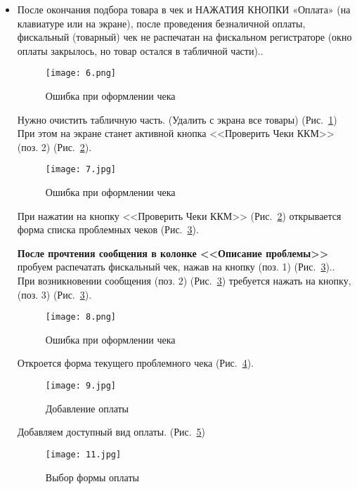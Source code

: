 \begin{itemize}	
	\item После окончания подбора товара в чек и НАЖАТИЯ КНОПКИ «Оплата» (на клавиатуре или на экране), после проведения безналичной оплаты, фискальный (товарный)  чек не распечатан на фискальном регистраторе (окно оплаты закрылось, но товар остался в табличной части).. 
	\begin{figure}[h]
		\texttt{[image: 6.png]}
		\caption{Ошибка при оформлении чека}
		\label{ris:6.png}
	\end{figure}
	Нужно очистить табличную часть. (Удалить с экрана все товары) (Рис.~\ref{ris:6.png})	 
	При этом на экране станет активной кнопка <<Проверить Чеки ККМ>> (поз. 2) (Рис.~\ref{ris:7.jpg}).

	\begin{figure}[h]
		\texttt{[image: 7.jpg]}
		\caption{Ошибка при оформлении чека}
		\label{ris:7.jpg}
	\end{figure}

	При нажатии на  кнопку <<Проверить Чеки ККМ>>  (Рис.~\ref{ris:7.jpg}) открывается форма списка проблемных чеков (Рис.~\ref{ris:8.png}).

	\textbf{ После прочтения сообщения в колонке <<Описание проблемы>>}  пробуем распечатать фискальный чек, нажав на кнопку (поз. 1) (Рис.~\ref{ris:8.png}).. При возникновении сообщения (поз. 2) (Рис.~\ref{ris:8.png}) требуется нажать на кнопку, (поз. 3) (Рис.~\ref{ris:8.png}). 
	
		\begin{figure}[H]
		\texttt{[image: 8.png]}
		\caption{Ошибка при оформлении чека}
		\label{ris:8.png}
	\end{figure}
	
	
	Откроется форма текущего проблемного чека (Рис.~\ref{ris:9.jpg}).
	

	\begin{figure}[H]
		\texttt{[image: 9.jpg]}
		\caption{Добавление оплаты}
		\label{ris:9.jpg}
	\end{figure}
	\par
\newpage
	Добавляем доступный вид оплаты. (Рис.~\ref{ris:11.jpg})

	\begin{figure}[H]
		\texttt{[image: 11.jpg]}
		\caption{Выбор формы оплаты}
		\label{ris:11.jpg}
	\end{figure}	


\end{itemize}
